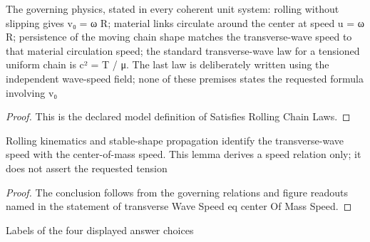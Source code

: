 \begin{definition}
  \label{def:physics:phyx-mini-0244:phyxminiproblems-problemphyxmini0244-satisfiesrollingchainlaws}
  The governing physics, stated in every coherent unit system: rolling without slipping gives v₀ = ω R; material links circulate around the center at speed u = ω R; persistence of the moving chain shape matches the transverse-wave speed to that material circulation speed; the standard transverse-wave law for a tensioned uniform chain is c² = T / μ. The last law is deliberately written using the independent wave-speed field; none of these premises states the requested formula involving v₀
\end{definition}
\begin{proof}
  This is the declared model definition of Satisfies Rolling Chain Laws.
\end{proof}
\begin{lemma}
  \label{lem:physics:phyx-mini-0244:phyxminiproblems-problemphyxmini0244-transversewavespeed-eq-centerofmassspeed}
  Rolling kinematics and stable-shape propagation identify the transverse-wave speed with the center-of-mass speed. This lemma derives a speed relation only; it does not assert the requested tension
\end{lemma}
\begin{proof}
  The conclusion follows from the governing relations and figure readouts named in the statement of transverse Wave Speed eq center Of Mass Speed.
\end{proof}
\begin{definition}
  \label{def:physics:phyx-mini-0244:phyxminiproblems-problemphyxmini0244-answerchoice}
  Labels of the four displayed answer choices
\end{definition}
